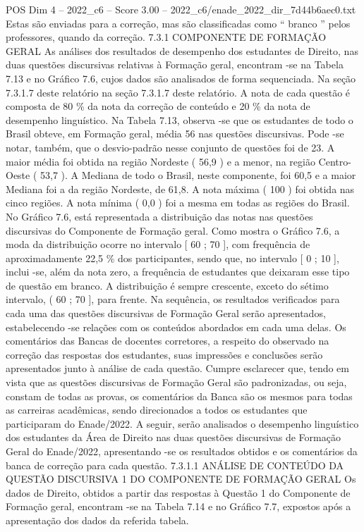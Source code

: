 \begin{textsample}{POS Dim 4 – 2022\_c6 – Score 3.00 – 2022\_c6/enade\_2022\_dir\_7d44b6aec0.txt}
Estas são enviadas para a correção, mas são classificadas como “ branco ” pelos professores, quando da correção. 7.3.1 COMPONENTE DE FORMAÇÃO GERAL As análises dos resultados de desempenho dos estudantes de Direito, nas duas questões discursivas relativas à Formação geral, encontram -se na Tabela 7.13 e no Gráfico 7.6, cujos dados são analisados de forma sequenciada.
Na seção 7.3.1.7 deste relatório na seção 7.3.1.7 deste relatório.
A nota de cada questão é composta de 80 \% da nota da correção de conteúdo e 20 \% da nota de desempenho linguístico.
Na Tabela 7.13, observa -se que os estudantes de todo o Brasil obteve, em Formação geral, média 56 nas questões discursivas.
Pode -se notar, também, que o desvio-padrão nesse conjunto de questões foi de 23.
A maior média foi obtida na região Nordeste ( 56,9 ) e a menor, na região Centro-Oeste ( 53,7 ).
A Mediana de todo o Brasil, neste componente, foi 60,5 e a maior Mediana foi a da região Nordeste, de 61,8.
A nota máxima ( 100 ) foi obtida nas cinco regiões.
A nota mínima ( 0,0 ) foi a mesma em todas as regiões do Brasil.
No Gráfico 7.6, está representada a distribuição das notas nas questões discursivas do Componente de Formação geral.
Como mostra o Gráfico 7.6, a moda da distribuição ocorre no intervalo [ 60 ; 70 ], com frequência de aproximadamente 22,5 \% dos participantes, sendo que, no intervalo [ 0 ; 10 ], inclui -se, além da nota zero, a frequência de estudantes que deixaram esse tipo de questão em branco.
A distribuição é sempre crescente, exceto do sétimo intervalo, ( 60 ; 70 ], para frente.
Na sequência, os resultados verificados para cada uma das questões discursivas de Formação Geral serão apresentados, estabelecendo -se relações com os conteúdos abordados em cada uma delas.
Os comentários das Bancas de docentes corretores, a respeito do observado na correção das respostas dos estudantes, suas impressões e conclusões serão apresentados junto à análise de cada questão.
Cumpre esclarecer que, tendo em vista que as questões discursivas de Formação Geral são padronizadas, ou seja, constam de todas as provas, os comentários da Banca são os mesmos para todas as carreiras acadêmicas, sendo direcionados a todos os estudantes que participaram do Enade/2022.
A seguir, serão analisados o desempenho linguístico dos estudantes da Área de Direito nas duas questões discursivas de Formação Geral do Enade/2022, apresentando -se os resultados obtidos e os comentários da banca de correção para cada questão. 7.3.1.1 ANÁLISE DE CONTEÚDO DA QUESTÃO DISCURSIVA 1 DO COMPONENTE DE FORMAÇÃO GERAL Os dados de Direito, obtidos a partir das respostas à Questão 1 do Componente de Formação geral, encontram -se na Tabela 7.14 e no Gráfico 7.7, expostos após a apresentação dos dados da referida tabela.

\end{textsample}

